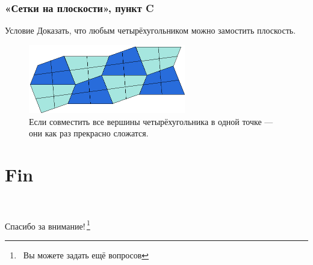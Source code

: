 \documentclass[aspectratio=1610,12pt]{beamer}
\def\fram#1#2{\begin{frame}\frametitle{\bf #1}#2\end{frame}}
\begin{document}
\fram{«Сетки на плоскости», пункт C}{
\vspace{0.3cm}
\begin{block}{Условие}
	Доказать, что любым четырёхугольником можно замостить плоскость.
\end{block}\pause
\vspace{-0.3cm}
\begin{figure}
	\includegraphics[height=3cm]{images/quadr-tessellate.png}
	\caption{Если совместить все вершины четырёхугольника в одной точке — они как раз прекрасно сложатся.}
\end{figure}
}


\section[Конец]{Fin}
\renewcommand{\thefootnote}{/*\!/}
\begin{frame}
	\ \\
	\centerline{\huge Спасибо за внимание!\,\footnote{\ Вы можете задать ещё вопросов}}
\end{frame}
\end{document}
